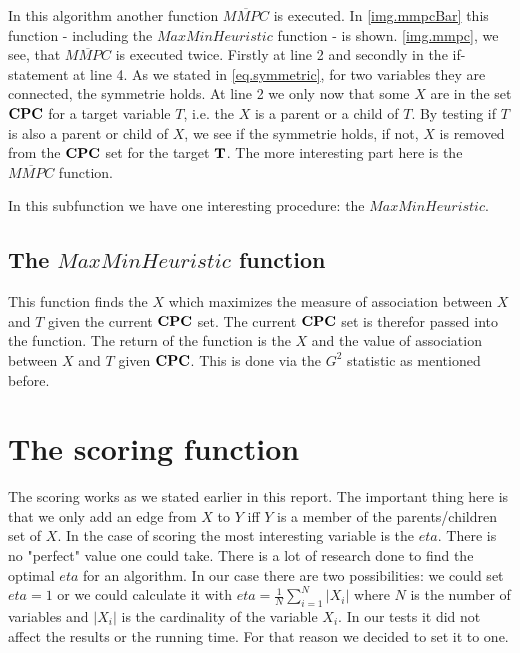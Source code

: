 			 \label{img.mmpc}

			In this algorithm another function $\overline{MMPC}$ is executed. In \autoref{img.mmpcBar} this function - including the $MaxMinHeuristic$ function - is shown. \autoref{img.mmpc}, we see, that $\overline{MMPC}$ is executed twice. Firstly at line 2 and secondly in the if-statement at line 4. As we stated in \autoref{eq.symmetric}, for two variables they are connected, the symmetrie holds. At line 2 we only now that some $X$ are in the set ${\textbf{CPC}}$ for a target variable $T$, i.e. the $X$ is a parent or a child of $T$. By testing if $T$ is also a parent or child of $X$, we see if the symmetrie holds, if not, $X$ is removed from the ${\textbf{CPC}}$ set for the target ${\textbf{T}}$. The more interesting part here is the $\overline{MMPC}$ function.

			 \label{img.mmpcBar}

			In this subfunction we have one interesting procedure: the $MaxMinHeuristic$.

			\subsection{The $MaxMinHeuristic$ function}

				This function finds the $X$ which maximizes the measure of association between $X$ and $T$ given the current ${\textbf{CPC}}$ set. The current ${\textbf{CPC}}$ set is therefor passed into the function. The return of the function is the $X$ and the value of association between $X$ and $T$ given ${\textbf{CPC}}$. This is done via the $G^{2}$ statistic as mentioned before.

		\section{The scoring function}

			The scoring works as we stated earlier in this report. The important thing here is that we only add an edge from $X$ to $Y$ iff $Y$ is a member of the parents/children set of $X$. In the case of scoring the most interesting variable is the $eta$. There is no "perfect" value one could take. There is a lot of research done to find the optimal $eta$ for an algorithm. In our case there are two possibilities: we could set $eta = 1$ or we could calculate it with $eta = \frac{1}{N} \sum_{i = 1}^{N} |X_{i}|$ where $N$ is the number of variables and $|X_{i}|$ is the cardinality of the variable $X_{i}$. In our tests it did not affect the results or the running time. For that reason we decided to set it to one.
			

